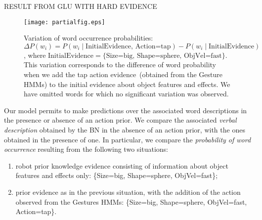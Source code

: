 RESULT FROM GLU WITH HARD EVIDENCE

\begin{figure}
\centering
\texttt{[image: partialfig.eps]}
\caption{Variation of word occurrence probabilities:
$\Delta P(w_i) = P(w_i \mid \text{InitialEvidence, Action=tap}) - P(w_i \mid \text{InitialEvidence})$, where $\text{InitialEvidence} = \{ \text{Size=big, Shape=sphere, ObjVel=fast} \}$.
This variation corresponds to the difference of word probability when we add the tap action evidence~(obtained from the Gesture \acp{HMM}) to the initial evidence about object features and effects. We have omitted words for which no significant variation was observed.}
\label{fig:probdiff}
\end{figure}

Our model permits to make predictions over the associated word descriptions in the presence or absence of an action prior.
We compare the associated \emph{verbal description} obtained by the \acl{BN} in the absence of an action prior, with the ones obtained in the presence of one.
In particular, we compare the \emph{probability of word occurrence} resulting from the following two situations:
\begin{enumerate}
\item robot prior knowledge evidence consisting of information about object features and effects only: %
\{Size=big, Shape=sphere, ObjVel=fast\};

\item prior evidence as in the previous situation, with the addition of the action observed from the Gestures \acp{HMM}: %
\{Size=big, Shape=sphere, ObjVel=fast, Action=tap\}.
\end{enumerate}

